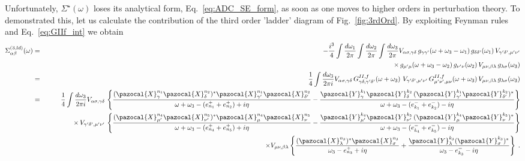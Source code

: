 Unfortunately, $\Sigma^\star(\omega)$ loses its analytical form, Eq.~\eqref{eq:ADC_SE_form}, as soon as one moves to higher orders in perturbation theory. To demonstrated this, let us calculate the contribution of the third order 'ladder' diagram of Fig.~\ref{fig:3rdOrd}. By exploiting Feynman rules
and Eq.~\eqref{eq:GIIf_int} we obtain
\begin{eqnarray}
  \Sigma^{(3,ld)}_{\alpha\beta}(\omega) &=& - \frac{i^3}{4} \int \frac{d\omega_1}{2\pi} \int \frac{d\omega_2}{2\pi} \int \frac{d\omega_3}{2\pi} 
  V_{\alpha\sigma,\gamma\delta} 
         \,  g_{\gamma\gamma'}(\omega+\omega_3-\omega_1) \, g_{\delta\delta'}(\omega_1) 
           \, V_{\gamma' \delta', \mu' \nu'}
  \nonumber \\ && \qquad \qquad \qquad \qquad \qquad \qquad \qquad \qquad \times
    \,  g_{\mu'\mu}(\omega+\omega_3-\omega_2) \, g_{\nu'\nu}(\omega_2) \, V_{\mu \nu, \beta \lambda} \,  g_{\lambda\sigma}(\omega_3) 
\nonumber \\
  &=&  \frac{1}{4}  \int \frac{d\omega_3}{2\pi i} 
  V_{\alpha\sigma,\gamma\delta} 
         \,  G^{II,f}_{\gamma\delta, \gamma' \delta'}(\omega+\omega_3) \,  
           \, V_{\gamma' \delta', \mu' \nu'}     \,  G^{II,f}_{\mu' \nu', \mu \nu}(\omega+\omega_3) \, V_{\mu \nu, \beta \lambda}  \, g_{\lambda\sigma}(\omega_3) 
\nonumber \\
  &=&  \frac{1}{4}  \int \frac{d\omega_3}{2\pi i} 
    V_{\alpha\sigma,\gamma\delta} \,
  \left\{
    \frac{(\pazocal{X}^{n_1}_\gamma \pazocal{X}^{n_2}_\delta)^*  \pazocal{X}^{n_1}_{\gamma'} \pazocal{X}^{n_2}_{\delta'}}
                      {\omega+\omega_3  - (e^+_{n_1}  + e^+_{n_2}) + i\eta} 
 -  \frac{ \pazocal{Y}^{k_1}_\gamma \pazocal{Y}^{k_2}_\delta \, ( \pazocal{Y}^{k_1}_{\gamma'} \pazocal{Y}^{k_2}_{\delta'})^*}
                     {\omega+\omega_3  - (e^-_{k_1} + e^-_{k_2}) - i\eta}
  \right\}
\nonumber \\
 && \qquad \qquad \times    \, V_{\gamma' \delta', \mu' \nu'} \,  \left\{
    \frac{( \pazocal{X}^{n_4}_{\mu'} \pazocal{X}^{n_5}_{\nu'})^*  \pazocal{X}^{n_4}_\mu \pazocal{X}^{n_5}_\nu}
                      {\omega+\omega_3  - (e^+_{n_4}  + e^+_{n_5}) + i\eta} 
 -  \frac{ \pazocal{Y}^{k_4}_{\mu'} \pazocal{Y}^{k_5}_{\nu'} \, (\pazocal{Y}^{k_4}_\mu \pazocal{Y}^{k_5}_\nu)^*}
                     {\omega+\omega_3  - (e^-_{k_4} + e^-_{k_5}) - i\eta}
  \right\}
 \nonumber \\
 && \qquad \qquad \qquad \qquad \times   V_{\mu \nu, \beta \lambda}
   \left\{ \frac{(\pazocal{X}^{n_3}_\lambda )^* \pazocal{X}^{n_3}_\sigma}{\omega_3  - e^+_{n_3} + i\eta} 
           + \frac{\pazocal{Y}^{k_3}_\lambda  (\pazocal{Y}^{k_3}_\sigma)^*}{\omega_3  - e^-_{k_3} - i\eta}  \right\}   \; .
\label{eq:LaddEg1}
 \end{eqnarray}
